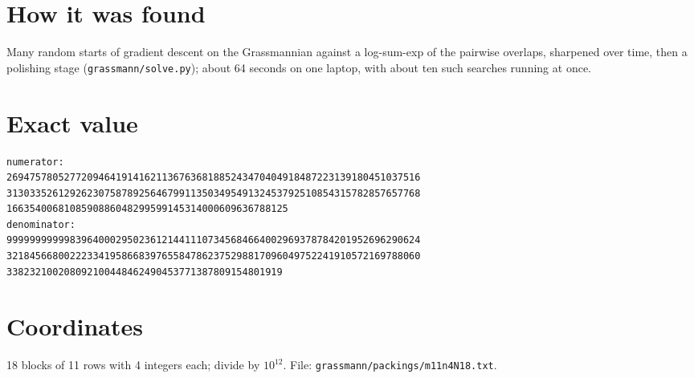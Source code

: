 \documentclass[11pt,a4paper]{article}
\begin{document}
\section{How it was found}
Many random starts of gradient descent on the Grassmannian against a log-sum-exp of the pairwise overlaps, sharpened over time, then a polishing stage (\texttt{grassmann/solve.py}); about 64 seconds on one laptop, with about ten such searches running at once.


\appendix
\section{Exact value}
{\small
\begin{verbatim}
numerator:
269475780527720946419141621136763681885243470404918487223139180451037516
313033526129262307587892564679911350349549132453792510854315782857657768
1663540068108590886048299599145314000609636788125
denominator:
999999999998396400029502361214411107345684664002969378784201952696290624
321845668002223341958668397655847862375298817096049752241910572169788060
338232100208092100448462490453771387809154801919
\end{verbatim}}

\section{Coordinates}
18 blocks of 11 rows with 4 integers each; divide by $10^{12}$. File: \texttt{grassmann/packings/m11n4N18.txt}.
{\tiny
\begin{multicols}{3}
\end{multicols}}
\end{document}
